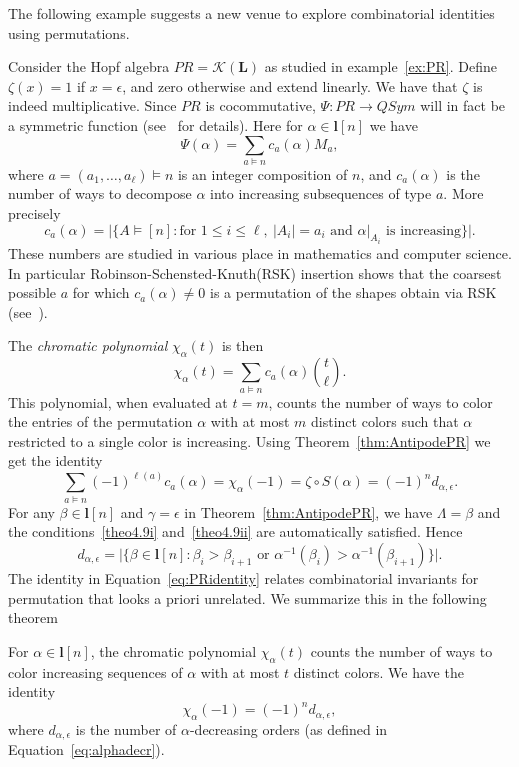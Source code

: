 \documentclass[ALCO,ThmDefs,Unicode,epreuves]{cedram}
\newcommand{\Kc}{\mathcal{K}}
\begin{document}
The following example suggests a new venue to explore combinatorial identities using permutations.
\begin{exam} Consider the Hopf algebra $PR=\Kc(\mathbf{L})$ as studied in example~\ref{ex:PR}. Define $\zeta(x)=1$ if $x=\epsilon$, and zero otherwise and extend linearly.
We have that $\zeta$ is indeed multiplicative. Since $PR$ is cocommutative, $\Psi\colon PR\to QSym$ will in fact be a symmetric function (see~\cite{ABS} for details). 
Here for $\alpha\in\mathbf{l}[n]$ we have
 $$ \Psi(\alpha)=\sum_{a\models n} c_a(\alpha) M_a, $$
where $a=(a_1,\ldots,a_\ell)\models n$ is an integer composition of $n$, and $c_a(\alpha)$ is the number of ways to decompose $\alpha$ into increasing subsequences of type $a$.
More precisely
 $$c_a(\alpha)=\big|\{ A\models [n] : \text{for } 1\le i\le \ell,\ |A_i|=a_i \text{ and }\alpha|_{A_i} \text{ is increasing}\}\big|.$$
These numbers are studied in various place in mathematics and computer science. In particular Robinson-Schensted-Knuth(RSK) insertion shows that the coarsest possible $a$ for which $c_a(\alpha)\ne 0$
is a permutation of the shapes obtain via RSK (see~\cite{permutation}).

The \emph{chromatic polynomial} $\chi_\alpha(t)$ is then
 $$ \chi_\alpha(t)=\sum_{a\models n} c_a(\alpha) %
  \genfrac{(}{)}{0pt}{0}{t}{\ell}. $$
 This polynomial, when evaluated at $t=m$, counts the number of ways to color the entries of the permutation $\alpha$ with at most $m$ distinct colors such that $\alpha$ restricted to a single color is increasing.
 Using Theorem~\ref{thm:AntipodePR} we get the identity
 \begin{equation}\label{eq:PRidentity}
 \sum_{a\models n} (-1)^{\ell(a)}c_a(\alpha) =\chi_\alpha(-1)=\zeta\circ S(\alpha) = (-1)^n d_{\alpha,\epsilon}.
 \end{equation}
For any $\beta\in\mathbf{l}[n]$ and $\gamma=\epsilon$ in Theorem~\ref{thm:AntipodePR}, we have $\Lambda=\beta$ and the conditions~\ref{theo4.9i} and~\ref{theo4.9ii}  are automatically satisfied.
Hence 
 \begin{equation}\label{eq:alphadecr}
 d_{\alpha,\epsilon}=\big|\{\beta\in \mathbf{l}[n] : \beta_i>\beta_{i+1}\text{ or }\alpha^{-1}(\beta_i)>\alpha^{-1}(\beta_{i+1})\}\big|.
 \end{equation}
 The identity in Equation~\eqref{eq:PRidentity} relates combinatorial invariants for permutation that looks a priori unrelated. We summarize this in the following theorem
\begin{theorem} 
For $\alpha\in\mathbf{l}[n]$, the chromatic polynomial $\chi_\alpha(t)$ counts the number of ways to color increasing sequences of $\alpha$ with at most $t$ distinct colors.
We have the identity
 $$ \chi_\alpha(-1) = (-1)^n d_{\alpha,\epsilon},$$
 where $d_{\alpha,\epsilon}$ is the number of $\alpha$-decreasing orders (as defined in Equation~\eqref{eq:alphadecr}).
\end{theorem}
\end{exam}
\end{document}
